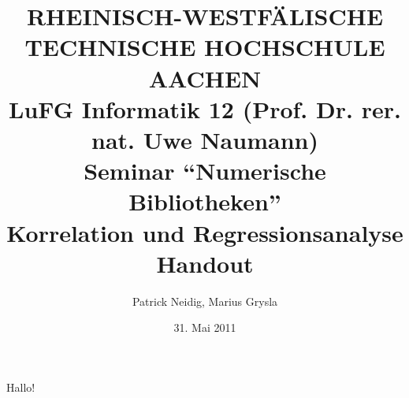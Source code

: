 \documentclass{article}
\title{
{\bf \scriptsize RHEINISCH-WESTF\"ALISCHE TECHNISCHE HOCHSCHULE AACHEN \\
LuFG Informatik 12 (Prof. Dr. rer. nat. Uwe Naumann)}\\
Seminar ``Numerische Bibliotheken''\\
{\bf \Large Korrelation und Regressionsanalyse} \\
{\large Handout} 
}
\author{Patrick Neidig, Marius Grysla}
\date{31. Mai 2011}
\begin{document}
\maketitle

Hallo!
\end{document}
